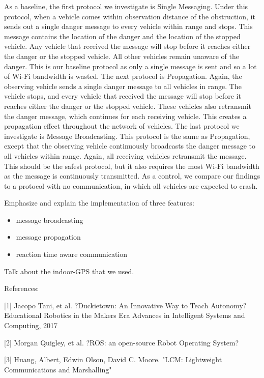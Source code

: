 As a baseline, the first protocol we investigate is Single Messaging. Under this protocol, when a vehicle comes within observation distance of the obstruction, it sends out a single danger message to every vehicle within range and stops. This message contains the location of the danger and the location of the stopped vehicle. Any vehicle that received the message will stop before it reaches either the danger or the stopped vehicle. All other vehicles remain unaware of the danger. This is our baseline protocol as only a single message is sent and so a lot of Wi-Fi bandwidth is wasted. The next protocol is Propagation. Again, the observing vehicle sends a single danger message to all vehicles in range. The vehicle stops, and every vehicle that received the message will stop before it reaches either the danger or the stopped vehicle. These vehicles also retransmit the danger message, which continues for each receiving vehicle. This creates a propagation effect throughout the network of vehicles. The last protocol we investigate is Message Broadcasting. This protocol is the same as Propagation, except that the observing vehicle continuously broadcasts the danger message to all vehicles within range. Again, all receiving vehicles retransmit the message. This should be the safest protocol, but it also requires the most Wi-Fi bandwidth as the message is continuously transmitted. As a control, we compare our findings to a protocol with no communication, in which all vehicles are expected to crash.


Emphasize and explain the implementation of three features:
\begin{itemize}
\item message broadcasting
\item message propagation
\item reaction time aware communication
\end{itemize}

Talk about the indoor-GPS that we used.



References:

[1] Jacopo Tani, et al. ?Duckietown: An Innovative Way to Teach Autonomy? Educational Robotics in the Makers Era Advances in Intelligent Systems and Computing, 2017

[2] Morgan Quigley, et al. ?ROS: an open-source Robot Operating System? 

[3] Huang, Albert, Edwin Olson, David C. Moore. "LCM: Lightweight Communications and Marshalling" 